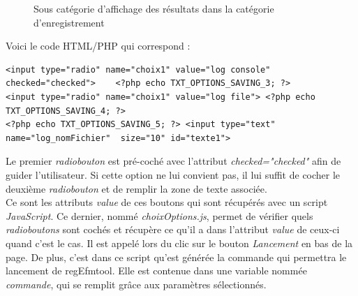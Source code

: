 \begin{figure}[!ht]
	\begin{center}
		\caption{Sous catégorie d'affichage des résultats dans la catégorie d'enregistrement}
  		\label{affichageResults}
  	\end{center}	
\end{figure}

Voici le code HTML/PHP qui correspond :

\scriptsize
\begin{DDbox}{\linewidth}
\begin{lstlisting}
<input type="radio" name="choix1" value="log console" checked="checked">	<?php echo TXT_OPTIONS_SAVING_3; ?> 
<input type="radio" name="choix1" value="log file"> <?php echo TXT_OPTIONS_SAVING_4; ?> 
<?php echo TXT_OPTIONS_SAVING_5; ?> <input type="text"	 name="log_nomFichier" 	size="10" id="texte1">
\end{lstlisting}
\end{DDbox}

\normalsize

Le premier \textit{radiobouton} est pré-coché avec l'attribut \textit{checked="checked"} afin de guider l'utilisateur. Si cette option ne lui convient pas, il lui suffit de cocher le deuxième \textit{radiobouton} et de remplir la zone de texte associée. \\

Ce sont les attributs \textit{value} de ces boutons qui sont récupérés avec un script \emph{JavaScript}. Ce dernier, nommé \emph{choixOptions.js}, permet de vérifier quels \textit{radioboutons} sont cochés et récupère ce qu'il a dans l'attribut \textit{value} de ceux-ci quand c'est le cas. Il est appelé lors du clic sur le bouton \textit{Lancement} en bas de la page. De plus, c'est dans ce script qu'est générée la commande qui permettra le lancement de regEfmtool. Elle est contenue dans une variable nommée  \textit{commande}, qui se remplit grâce aux paramètres sélectionnés. \\

